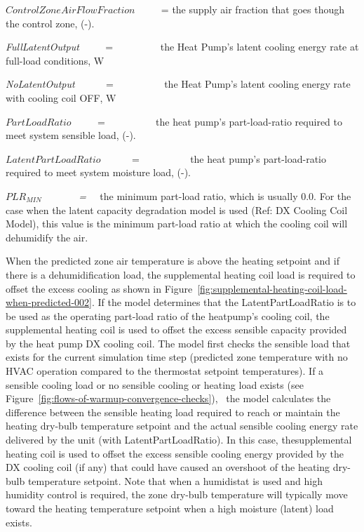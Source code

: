 \(ControlZoneAirFlowFraction\) ~~~~ = the supply air fraction that goes though the control zone, (-).

\emph{FullLatentOutput} ~~~~ = ~~~~~~~~~the Heat Pump's latent cooling energy rate at full-load conditions, W

\emph{NoLatentOutput} ~~~~~ = ~~~~~~~~~ the Heat Pump's latent cooling energy rate with cooling coil OFF, W

\(PartLoadRatio\) ~~~~ = ~~~~~~~~~ the heat pump's part-load-ratio required to meet system sensible load, (-).

\(LatentPartLoadRatio\) ~~~~~ = ~~~~~~~~~ the heat pump's part-load-ratio required to meet system moisture load, (-).

\(PL{R_{MIN}}\) \emph{~~~~~~ = ~~}the minimum part-load ratio, which is usually 0.0. For the case when the latent capacity degradation model is used (Ref: DX Cooling Coil Model), this value is the minimum part-load ratio at which the cooling coil will dehumidify the air.

When the predicted zone air temperature is above the heating setpoint and if there is a dehumidification load, the supplemental heating coil load is required to offset the excess cooling as shown in Figure~\ref{fig:supplemental-heating-coil-load-when-predicted-002}. If the model determines that the LatentPartLoadRatio is to be used as the operating part-load ratio of the heatpump's cooling coil, the supplemental heating coil is used to offset the excess sensible capacity provided by the heat pump DX cooling coil. The model first checks the sensible load that exists for the current simulation time step (predicted zone temperature with no HVAC operation compared to the thermostat setpoint temperatures). If a sensible cooling load or no sensible cooling or heating load exists (see Figure~\ref{fig:flows-of-warmup-convergence-checks}),~ the model calculates the difference between the sensible heating load required to reach or maintain the heating dry-bulb temperature setpoint and the actual sensible cooling energy rate delivered by the unit (with LatentPartLoadRatio). In this case, thesupplemental heating coil is used to offset the excess sensible cooling energy provided by the DX cooling coil (if any) that could have caused an overshoot of the heating dry-bulb temperature setpoint. Note that when a humidistat is used and high humidity control is required, the zone dry-bulb temperature will typically move toward the heating temperature setpoint when a high moisture (latent) load exists.

